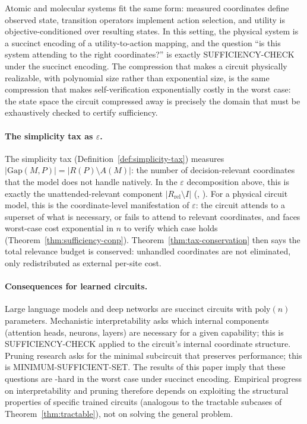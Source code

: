 Atomic and molecular systems fit the same form: measured coordinates define observed state, transition operators implement action selection, and utility is objective-conditioned over resulting states.
In this setting, the physical system is a succinct encoding of a utility-to-action mapping, and the question ``is this system attending to the right coordinates?'' is exactly SUFFICIENCY-CHECK under the succinct encoding.
The compression that makes a circuit physically realizable, with polynomial size rather than exponential size, is the same compression that makes self-verification exponentially costly in the worst case: the state space the circuit compressed away is precisely the domain that must be exhaustively checked to certify sufficiency.

\paragraph{The simplicity tax as $\varepsilon$.}
The simplicity tax (Definition~\ref{def:simplicity-tax}) measures $|\mathrm{Gap}(M,P)| = |R(P) \setminus A(M)|$: the number of decision-relevant coordinates that the model does not handle natively. In the $\varepsilon$ decomposition above, this is exactly the unattended-relevant component $|R_{\mathrm{rel}}\setminus I|$ (, ). For a physical circuit model, this is the coordinate-level manifestation of $\varepsilon$: the circuit attends to a superset of what is necessary, or fails to attend to relevant coordinates, and faces worst-case cost exponential in $n$ to verify which case holds (Theorem~\ref{thm:sufficiency-conp}). Theorem~\ref{thm:tax-conservation} then says the total relevance budget is conserved: unhandled coordinates are not eliminated, only redistributed as external per-site cost.

\paragraph{Consequences for learned circuits.}
Large language models and deep networks are succinct circuits with $\mathrm{poly}(n)$ parameters.
Mechanistic interpretability asks which internal components (attention heads, neurons, layers) are necessary for a given capability; this is SUFFICIENCY-CHECK applied to the circuit's internal coordinate structure.
Pruning research asks for the minimal subcircuit that preserves performance; this is MINIMUM-SUFFICIENT-SET.
The results of this paper imply that these questions are \coNP-hard in the worst case under succinct encoding.
Empirical progress on interpretability and pruning therefore depends on exploiting the structural properties of specific trained circuits (analogous to the tractable subcases of Theorem~\ref{thm:tractable}), not on solving the general problem.

